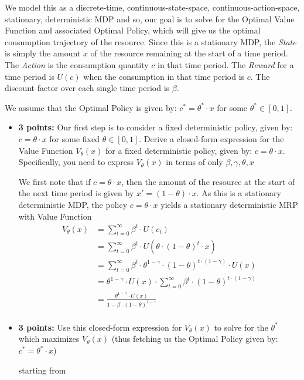 \documentclass[12pt]{exam}
\begin{document}
\begin{questions}
We model this as a discrete-time, continuous-state-space, continuous-action-space, stationary, deterministic MDP and so, our goal is to solve for the Optimal Value Function and associated Optimal Policy, which will give us the optimal consumption trajectory of the resource. Since this is a stationary MDP, the {\em State} is simply the amount $x$ of the resource remaining at the start of a time period. The {\em Action} is the consumption quantity $c$ in that time period. The {\em Reward} for a time period is $U(c)$ when the consumption in that time period is $c$.  The discount factor over each single time period is $\beta$.

We assume that the Optimal Policy is given by: $c^* = \theta^* \cdot x$ for some $\theta^* \in [0, 1]$.

\begin{itemize}
\item {\bf 3 points: } Our first step is to consider a fixed deterministic policy, given by: $c = \theta \cdot x$ for some fixed $\theta \in [0,1]$. Derive a closed-form expression for the Value Function $V_{\theta}(x)$ for a fixed deterministic policy, given by: $c = \theta \cdot x$.  Specifically, you need to express $V_{\theta}(x)$ in terms of only $\beta, \gamma, \theta, x$
\begin{solution}

    We first note that if $c = \theta \cdot x$, then the amount of the resource at the start of the next time period is given by $x' = (1 - \theta)\cdot x$. As this is a stationary deterministic MDP, the policy $c = \theta \cdot x$ yields a stationary deterministic MRP with Value Function
    \begin{align*}
        V_{\theta}(x) &= \sum_{t=0}^{\infty} \beta^t \cdot U(c_t)\\
        &= \sum_{t=0}^{\infty} \beta^t \cdot U(\theta \cdot (1 - \theta)^t \cdot x)\\
        &= \sum_{t=0}^{\infty} \beta^t \cdot \theta^{1-\gamma} \cdot (1 - \theta)^{t \cdot (1-\gamma)}\cdot U( x)\\
        &= \theta^{1-\gamma} \cdot U(x) \cdot \sum_{t=0}^{\infty} \beta^t \cdot (1 - \theta)^{t \cdot (1-\gamma)}\\
        &= \frac{\theta^{1-\gamma} \cdot U(x)} {1 - \beta \cdot (1 - \theta)^{1-\gamma}}\\
    \end{align*}
\end{solution}
\item {\bf 3 points: } Use this closed-form expression for $V_{\theta}(x)$ to solve for the $\theta^*$ which maximizes $V_{\theta}(x)$ (thus fetching us the Optimal Policy given by: $c^* = \theta^* \cdot x$)\\
\begin{solution}
starting from 


\end{solution}
\end{itemize}
\end{questions}
\end{document}
